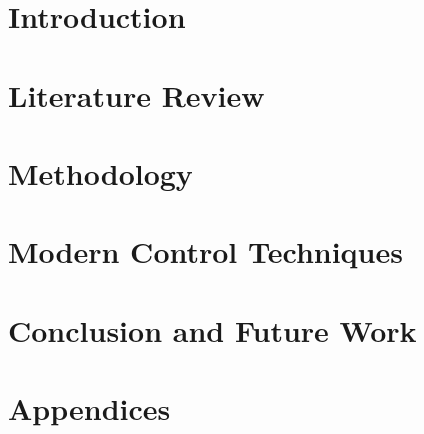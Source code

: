 \documentclass[oneside]{book}
\begin{document}
\frontmatter





\mainmatter
\chapter{Introduction}


\chapter{Literature Review}


\chapter{Methodology}


\chapter{Modern Control Techniques}


\chapter{Conclusion and Future Work}


\appendix
\chapter{Appendices}




\end{document}
